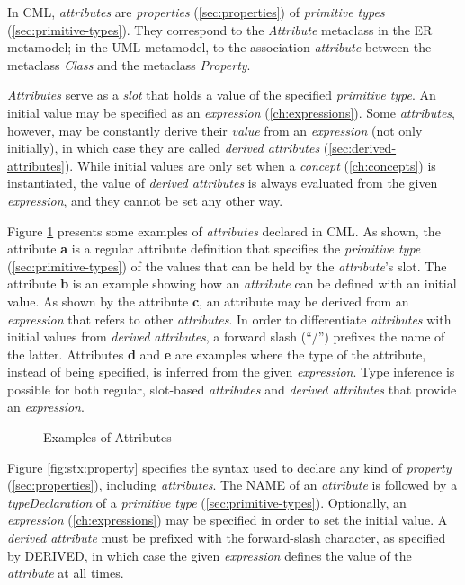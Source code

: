 In CML, \emph{attributes} are \emph{properties} (\ref{sec:properties})
of \emph{primitive types} (\ref{sec:primitive-types}).
They correspond to the \emph{Attribute} metaclass 
in the ER \cite{er} metamodel;
in the UML \cite{uml} metamodel,
to the association \emph{attribute} between the metaclass \emph{Class} 
and the metaclass \emph{Property}.

\emph{Attributes} serve as a \emph{slot} that holds a value of 
the specified \emph{primitive type}.
An initial value may be specified as an \emph{expression} (\ref{ch:expressions}).
Some \emph{attributes}, however, may be constantly
derive their \emph{value} from an \emph{expression} (not only initially),
in which case they are called \emph{derived attributes} (\ref{sec:derived-attributes}).
While initial values are only set when a \emph{concept} (\ref{ch:concepts})
is instantiated,
the value of \emph{derived attributes} is always evaluated 
from the given \emph{expression},
and they cannot be set any other way.

\begin{examples}
Figure \ref{fig:ex:attributes} presents some examples of \emph{attributes} declared in CML.
As shown,
the attribute \textbf{a} is a regular attribute definition 
that specifies the \emph{primitive type} (\ref{sec:primitive-types})
of the values that can be held by the \emph{attribute}'s slot.
The attribute \textbf{b} is an example showing how an \emph{attribute}
can be defined with an initial value.
As shown by the attribute \textbf{c}, 
an attribute may be derived from an \emph{expression}
that refers to other \emph{attributes}.
In order to differentiate \emph{attributes} with initial values
from \emph{derived attributes},
a forward slash (``/'') prefixes the name of the latter.
Attributes \textbf{d} and \textbf{e} are examples
where the type of the attribute,
instead of being specified,
is inferred from the given \emph{expression}.
Type inference is possible for both regular, slot-based \emph{attributes}
and \emph{derived attributes} that provide an \emph{expression}.
\end{examples}

\begin{figure}
\verbatimfont{\small}

\caption{Examples of Attributes}
\label{fig:ex:attributes}
\end{figure}

\begin{concrete-syntax}
Figure \ref{fig:stx:property} specifies the syntax used
to declare any kind of \emph{property} (\ref{sec:properties}),
including \emph{attributes}.
The NAME of an \emph{attribute} is followed
by a \emph{typeDeclaration} of a \emph{primitive type}
(\ref{sec:primitive-types}).
Optionally, an \emph{expression} (\ref{ch:expressions}) may be specified
in order to set the initial value.
A \emph{derived attribute} must be prefixed with the forward-slash character,
as specified by DERIVED,
in which case the given \emph{expression} defines the value
of the \emph{attribute} at all times.
\end{concrete-syntax}

